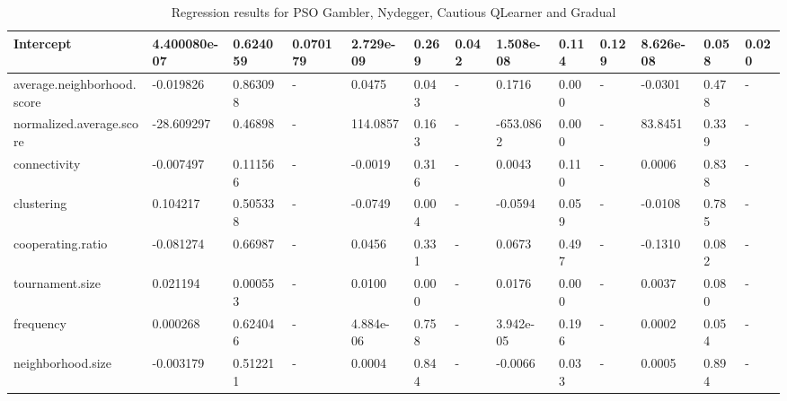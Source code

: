 \begin{table}[!hbtp]
\begin{adjustbox}{width=1\textwidth}
\begin{tabular}{|l|l|l|l|l|l|l|l|l|l|l|l|l|}
			Intercept                  & 4.400080e-07 & 0.624059    & 0.070179      & 2.729e-09   & 0.269       & 0.042         & 1.508e-08   & 0.114       & 0.129         & 8.626e-08       & 0.058       & 0.020         \\ \hline
			average.neighborhood.score & -0.019826    & 0.863098    & -             & 0.0475      & 0.043       & -             & 0.1716      & 0.000       & -             & -0.0301         & 0.478       & -             \\ \hline
			normalized.average.score   & -28.609297   & 0.46898     & -             & 114.0857    & 0.163       & -             & -653.0862   & 0.000       & -             & 83.8451         & 0.339       & -             \\ \hline
			connectivity               & -0.007497    & 0.111566    & -             & -0.0019     & 0.316       & -             & 0.0043      & 0.110       & -             & 0.0006          & 0.838       & -             \\ \hline
			clustering                 & 0.104217     & 0.505338    & -             & -0.0749     & 0.004       & -             & -0.0594     & 0.059       & -             & -0.0108         & 0.785       & -             \\ \hline
			cooperating.ratio          & -0.081274    & 0.66987     & -             & 0.0456      & 0.331       & -             & 0.0673      & 0.497       & -             & -0.1310         & 0.082       & -             \\ \hline
			tournament.size            & 0.021194     & 0.000553    & -             & 0.0100      & 0.000       & -             & 0.0176      & 0.000       & -             & 0.0037          & 0.080       & -             \\ \hline
			frequency                  & 0.000268     & 0.624046    & -             & 4.884e-06   & 0.758       & -             & 3.942e-05   & 0.196       & -             & 0.0002          & 0.054       & -             \\ \hline
			neighborhood.size          & -0.003179    & 0.512211    & -             & 0.0004      & 0.844       & -             & -0.0066     & 0.033       & -             & 0.0005          & 0.894       & -             \\ \bottomrule

		\end{tabular}
	\end{adjustbox}
	\caption{Regression results for PSO Gambler, Nydegger, Cautious QLearner and Gradual}
	\label{reg-for-top}
\end{table}

